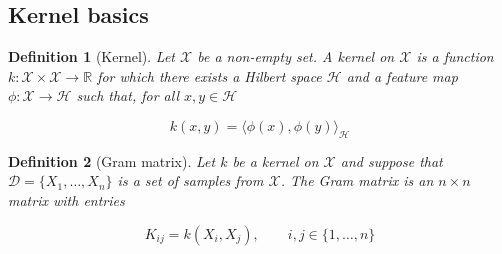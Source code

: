 \documentclass[12pt]{article}
\newtheorem{definition}{Definition}
\numberwithin{claim}{section}
\numberwithin{lemma}{section}
\numberwithin{theorem}{section}
\begin{document}
\subsection{Kernel basics}

\begin{definition}[Kernel] Let $\mathcal{X}$ be a non-empty set. A \emph{kernel on $\mathcal{X}$} is a function $k:\mathcal{X}\times \mathcal{X} \longrightarrow \mathbb{R}$ for which there exists a Hilbert space $\mathcal{H}$ and a \emph{feature map} $\phi: \mathcal{X} \longrightarrow \mathcal{H}$ such that, for all $x, y \in  \mathcal{H}$

\[k(x,y) = \langle \phi(x),\phi(y) \rangle_\mathcal{H}\]
\end{definition}

\begin{definition}[Gram matrix] Let $k$ be a kernel on $\mathcal{X}$ and suppose that $\mathcal{D} = \{X_1,\ldots,X_n \}$ is a set of samples from $\mathcal{X}$. The Gram matrix is an $n \times n$ matrix with entries

\[K_{ij} = k(X_i,X_j), \quad \quad i,j \in \{1,\ldots,n\}\]
\end{definition}
\end{document}
